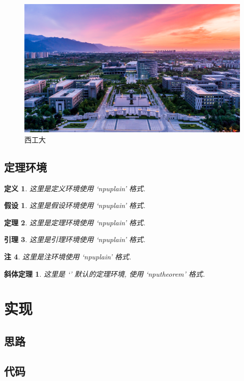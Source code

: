 \documentclass[twoside, UTF8, phd]{nputhesis}
\theoremstyle{npuplain}
\newtheorem{theorem}{定理}[section]
\newtheorem{lemma}[theorem]{引理}
\newtheorem{remark}[theorem]{注}
\newtheorem{definition}[theorem]{定义}
\newtheorem{assumption}{假设}
\theoremstyle{nputheorem}
\newtheorem{npu-thm}{斜体定理}[section]
\begin{document}
\lipsum[2]

\begin{figure}[h!]
    \centering
    \includegraphics[width=.8\textwidth]{figures/campus.jpg}
    \caption{西工大}
\end{figure}
\lipsum[2]


\section{定理环境}
\begin{definition}
  这里是定义环境使用 `npuplain' 格式.
\end{definition}
\begin{assumption}
  这里是假设环境使用 `npuplain' 格式.
\end{assumption}
\begin{theorem}
  这里是定理环境使用 `npuplain' 格式.
\end{theorem}
\begin{lemma}
  这里是引理环境使用 `npuplain' 格式.
\end{lemma}
\begin{remark}
  这里是注环境使用 `npuplain' 格式.
\end{remark}
\begin{npu-thm}
  这里是 `' 默认的定理环境, 使用 `nputheorem' 格式.
\end{npu-thm}


\chapter{实现}
\section{思路}
\section{代码}
\end{document}

